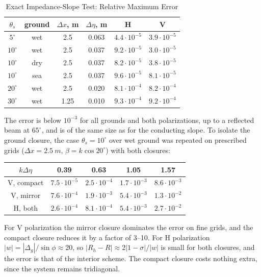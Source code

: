 \documentclass[journal]{IEEEtran}
\begin{document}
\begin{table}[!t]\centering
\caption{Exact Impedance-Slope Test: Relative Maximum Error}\label{tab:impslope}
\setlength{\tabcolsep}{4pt}
\begin{tabular}{cccccc}\toprule
$\theta_s$ & ground & $\Delta x$, m & $\Delta\eta$, m & H & V\\\midrule
$5^\circ$ & wet & 2.5 & 0.063 & $4.4\cdot10^{-5}$ & $3.9\cdot10^{-5}$\\
$10^\circ$ & wet & 2.5 & 0.037 & $9.2\cdot10^{-5}$ & $3.0\cdot10^{-5}$\\
$10^\circ$ & dry & 2.5 & 0.037 & $8.2\cdot10^{-5}$ & $3.8\cdot10^{-5}$\\
$10^\circ$ & sea & 2.5 & 0.037 & $9.6\cdot10^{-5}$ & $8.1\cdot10^{-5}$\\
$20^\circ$ & wet & 2.5 & 0.020 & $8.1\cdot10^{-4}$ & $8.2\cdot10^{-4}$\\
$30^\circ$ & wet & 1.25 & 0.010 & $9.3\cdot10^{-4}$ & $9.2\cdot10^{-4}$\\
\bottomrule\end{tabular}
\end{table}

The error is below $10^{-3}$ for all grounds and both polarizations, up to a
reflected beam at $65^\circ$, and is of the same size as for the conducting
slope. To isolate the ground closure, the case $\theta_s=10^\circ$ over wet
ground was repeated on prescribed grids ($\Delta x=\SI{2.5}{m}$,
$\beta=k\cos20^\circ$) with both closures:

\begin{center}
\setlength{\tabcolsep}{4pt}
\begin{tabular}{ccccc}\toprule
$k\Delta\eta$ & 0.39 & 0.63 & 1.05 & 1.57\\\midrule
V, compact & $7.5\cdot10^{-5}$ & $2.5\cdot10^{-4}$ & $1.7\cdot10^{-3}$ & $8.6\cdot10^{-3}$\\
V, mirror  & $7.6\cdot10^{-4}$ & $1.9\cdot10^{-3}$ & $5.4\cdot10^{-3}$ & $1.3\cdot10^{-2}$\\
H, both    & $2.6\cdot10^{-4}$ & $8.1\cdot10^{-4}$ & $5.4\cdot10^{-3}$ & $2.7\cdot10^{-2}$\\
\bottomrule\end{tabular}
\end{center}

For V polarization the mirror closure dominates the error on fine grids, and the
compact closure reduces it by a factor of 3--10. For H polarization
$|w|=|\Delta_g|/\sin\phi\approx20$, so $|R_h-R|\approx2|1-\sigma|/|w|$ is small
for both closures, and the error is that of the interior scheme. The compact
closure costs nothing extra, since the system remains tridiagonal.
\end{document}
